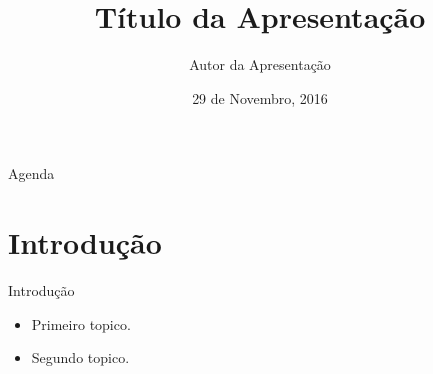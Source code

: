 \documentclass{beamer}
\title{Título da Apresentação}
\author{Autor da Apresentação}
\date{29 de Novembro, 2016}
\institute
{
  Universidade Federal do Rio de Janeiro\\
  UFRJ/COPPE/PESC
}
\begin{document}
{
\begin{frame}
  \bigskip\bigskip\bigskip\bigskip
  \titlepage
\end{frame}
}

\begin{frame}{Agenda}
  \tableofcontents
\end{frame}

\section{Introdução}

\begin{frame}{Introdução}
  \begin{itemize}
  \item {
    Primeiro topico.
    \pause
  }
  \item {
    Segundo topico.
  }
  \end{itemize}
\end{frame}
\end{document}
